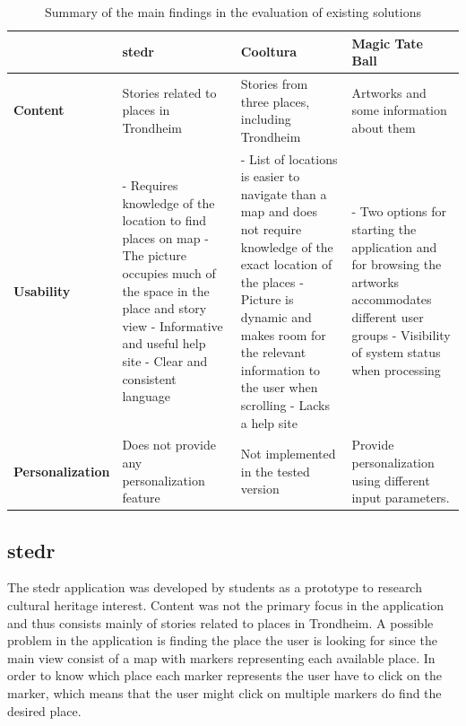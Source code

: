 \begin{table}[t]
	\caption{Summary of the main findings in the evaluation of existing solutions}
	\begin{tabular}[b]{ | p{2.7cm} | >{\raggedright}p{4.3cm} | >{\raggedright}p{4.3cm} | p{4.3cm} |}
		\hline
		\textbf{} & \textbf{stedr} & \textbf{Cooltura} & \textbf{Magic Tate Ball} \\ \hline
		\textbf{Content} & Stories related to places in Trondheim & Stories from three places, including Trondheim & Artworks and some information about them \\ \hline
		\textbf{Usability} & 
			- Requires knowledge of the location to find places on map \newline
			- The picture occupies much of the space in the place and story view \newline
			- Informative and useful help site\newline
			- Clear and consistent language 
			& 
			- List of locations is easier to navigate than a map and does not require knowledge of the exact location of the places\newline
			- Picture is dynamic and makes room for the relevant information to the user when scrolling \newline
			- Lacks a help site
			&  
			- Two options for starting the application and for browsing the artworks accommodates different user groups \newline
			- Visibility of system status when processing 
			 \\ \hline
		\textbf{Personalization} & Does not provide any personalization feature & Not implemented in the tested version & Provide personalization using different input parameters.  \\ \hline
	\end{tabular}
	\label{Tab:existing_solutions}
\end{table}

\subsection{stedr}
\label{subsec:stedr}

The stedr application was developed by students as a prototype to research cultural heritage interest. Content was not the primary focus in the application and thus consists mainly of stories related to places in Trondheim. A possible problem in the application is finding the place the user is looking for since the main view consist of a map with markers representing each available place. In order to know which place each marker represents the user have to click on the marker, which means that the user might click on multiple markers do find the desired place. \newline

